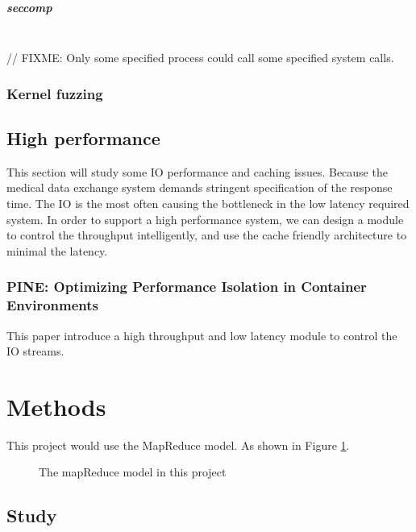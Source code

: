 \documentclass[12pt,a4paper]{IEEEconf}
\begin{document}
\subparagraph{seccomp}\mbox{}\\
// FIXME: Only some specified process could call some specified system calls.

\subsubsection{Kernel fuzzing}

\hypertarget{heigh_performance}{\subsection{High performance}}
This section will study some IO performance and caching issues. Because the medical
data exchange system demands stringent specification of the response time.
The IO is the most often causing the bottleneck in the low latency required system.
In order to support a high performance system, we can design a module to control
the throughput intelligently, and use the cache friendly architecture to minimal the
latency.

\subsubsection{PINE: Optimizing Performance Isolation in Container Environments}
This paper\cite{Optimizing} introduce a high throughput and low latency module to control
the IO streams.



\section{Methods}
This project would use the MapReduce model. As shown in Figure \ref*{Fig:model}.

\begin{figure}
  \centering
  \caption[]{The mapReduce model in this project}
  \label{Fig:model}
\end{figure}

\subsection{Study}
\end{document}
